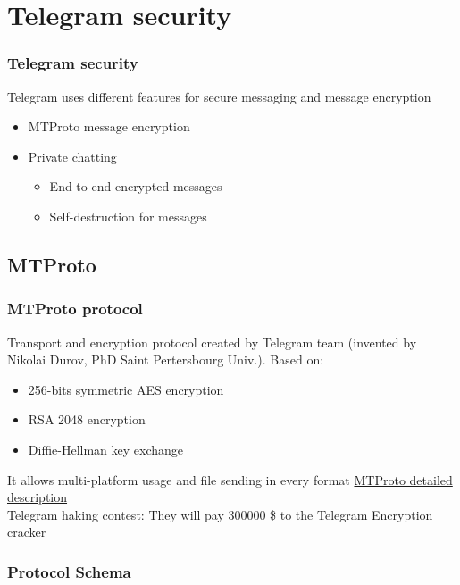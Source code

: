 \documentclass{beamer}
\begin{document}
\section{Telegram security}

\begin{frame}
\frametitle{Telegram security}
Telegram uses different features for secure messaging and message encryption
\begin{itemize}
\item MTProto message encryption
\item Private chatting
\begin{itemize}
\item End-to-end encrypted messages
\item Self-destruction for messages
\end{itemize}
\end{itemize}
\end{frame}

\subsection{MTProto}

\begin{frame}
\frametitle{MTProto protocol}
Transport and encryption protocol created by Telegram team (invented by Nikolai Durov, PhD Saint Pertersbourg Univ.).
Based on:
\begin{itemize}
\item 256-bits symmetric AES encryption
\item RSA 2048 encryption
\item Diffie-Hellman key exchange
\end{itemize}
It allows multi-platform usage and file sending in every format
\href{https://core.telegram.org/mtproto/description}{\color{blue}MTProto detailed description} \\
Telegram haking contest: They will pay 300000 \$ to the Telegram Encryption cracker
\end{frame}

\subsubsection{Protocol Schema}
\end{document}
